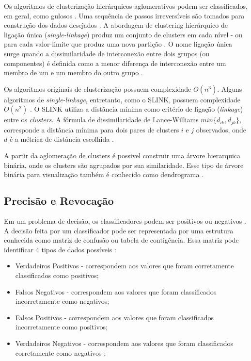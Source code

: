 \begin{document}
Os algoritmos de clusterização hierárquicos aglomerativos podem ser classificados, em geral, como gulosos \cite{SINGLE_LINKAGE}. Uma sequência de passos irreversíveis são tomados para construção dos dados desejados \cite{SINGLE_LINKAGE}. A abordagem de clustering hierárquico de ligação única (\textit{single-linkage}) produz um conjunto de clusters em cada nível - ou para cada valor-limite que produz uma nova partição \cite{SINGLE_LINKAGE}. O nome ligação única surge quando a dissimilaridade de interconexão entre dois grupos (ou componentes) é definida como a menor diferença de interconexão entre um membro de um e um membro do outro grupo \cite{SINGLE_LINKAGE}.

Os algoritmos originais de clusterização possuem complexidade $O(n^3)$. Alguns algoritmos de \textit{single-linkage}, entretanto, como o SLINK, possuem complexidade $O(n^2)$ \cite{SLINK} \cite{SINGLE_LINKAGE}. O SLINK utiliza a distância mínima como critério de ligação (\textit{linkage}) entre os \textit{clusters}. A fórmula de dissimilaridade de Lance-Williams $min\{d_{ik}, d_{jk}\}$, corresponde a distância mínima para dois pares de clusters $i$ e $j$ observados, onde $d$ é a métrica de distância escolhida \cite{SINGLE_LINKAGE}.

A partir da aglomeração de clusters é possivel construir uma árvore hierarquica binária, onde os clusters são agrupados por sua similaridade. Esse tipo de árvore binária para visualização também é conhecido como dendrograma \cite{SINGLE_LINKAGE}.


\subsection{Precisão e Revocação} \label{ssec:prec_recall}

Em um problema de decisão, os classificadores podem ser positivos ou negativos \cite{PRECISION_RECALL}. A decisão feita por um classificador pode ser representada por uma estrutura conhecida como matriz de confusão ou tabela de contigência. Essa matriz pode identificar 4 tipos de dados possíveis \cite{PRECISION_RECALL}:

\begin{itemize}
 \item Verdadeiros Positivos - correspondem aos valores que foram corretamente classificados como positivos;
 \item Falsos Negativos - correspondem aos valores que foram classificados incorretamente como negativos;
 \item Falsos Positivos - correspondem aos valores que foram classificados incorretamente como positivos;
 \item Verdadeiros Negativos - correspondem aos valores que foram classificados corretamente como negativos \cite{PRECISION_RECALL};
\end{itemize}
\end{document}
